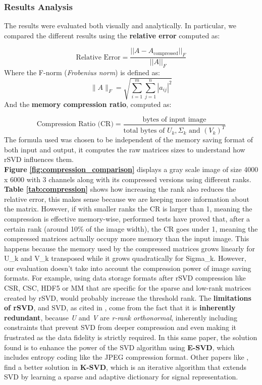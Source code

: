 \documentclass[11pt,a4paper]{article}
\begin{document}
\subsubsection{Results Analysis}
The results were evaluated both visually and analytically. In particular, we compared the different results using the \textbf{relative error} computed as:

\[\text{Relative Error} = \frac{||A-A_{\text{compressed}}||_F}{||A||_F}\]
Where the F-norm (\textit{Frobenius norm}) is defined as:
\[\|A\|_F = \sqrt{\sum_{i=1}^m \sum_{j=1}^n |a_{ij}|^2}\]
And the \textbf{memory compression ratio}, computed as:

\[\text{Compression Ratio (CR)} = \frac{\text{bytes of input image}}{\text{total bytes of } U_k, \Sigma_k \text{ and } (V_k)^T} \]
The formula used was chosen to be independent of the memory saving format of both input and output, it computes the raw matrices sizes to understand how rSVD influences them. \\
\textbf{Figure} \textbf{\ref{fig:compression_comparison}} displays a gray scale image of size 4000 x 6000 with 3 channels along with its compressed versions using different ranks. \textbf{Table \ref{tab:compression}} shows how increasing the rank also reduces the relative error, this makes sense because we are keeping more information about the matrix. However, if with smaller ranks the CR is larger than 1, meaning the compression is effective memory-wise, performed tests have proved that, after a certain rank (around 10\% of the image width), the CR goes under 1, meaning the compressed matrices actually occupy more memory than the input image. This happens because the memory used by the compressed matrices grows linearly for U\_k and V\_k transposed while it grows quadratically for Sigma\_k. However, our evaluation doesn't take into account the compression power of image saving formats. For example, using data storage formats after rSVD compression like CSR, CSC, HDF5 or MM that are specific for the sparse and low-rank matrices created by rSVD, would probably increase the threshold rank. The \textbf{limitations of rSVD}, and SVD, as cited in \cite{WANG2023102182}, come from the fact that it is \textbf{inherently redundant}, because \textit{U} and \textit{V} are \textit{r-rank orthonormal}, inherently including constraints that prevent SVD from deeper compression and even making it frustrated as the data fidelity is strictly required. In this same paper, the solution found is to enhance the power of the SVD algorithm using \textbf{E-SVD}, which includes entropy coding like the JPEG compression format. Other papers like \cite{BRYT2008270}, find a better solution in \textbf{K-SVD}, which is an iterative algorithm that extends SVD by learning a sparse and adaptive dictionary for signal representation. 
\end{document}
